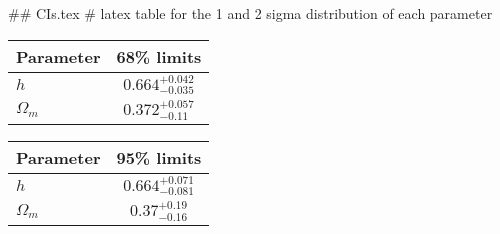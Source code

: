 ## CIs.tex
# latex table for the 1 and 2 sigma distribution of each parameter

\begin{tabular} { l  c}
 Parameter &  68\% limits\\
\hline
{\boldmath$h              $} & $0.664^{+0.042}_{-0.035}   $\\
{\boldmath$\Omega_m       $} & $0.372^{+0.057}_{-0.11}    $\\
\hline
\end{tabular}

\begin{tabular} { l  c}
 Parameter &  95\% limits\\
\hline
{\boldmath$h              $} & $0.664^{+0.071}_{-0.081}   $\\
{\boldmath$\Omega_m       $} & $0.37^{+0.19}_{-0.16}      $\\
\hline
\end{tabular}
